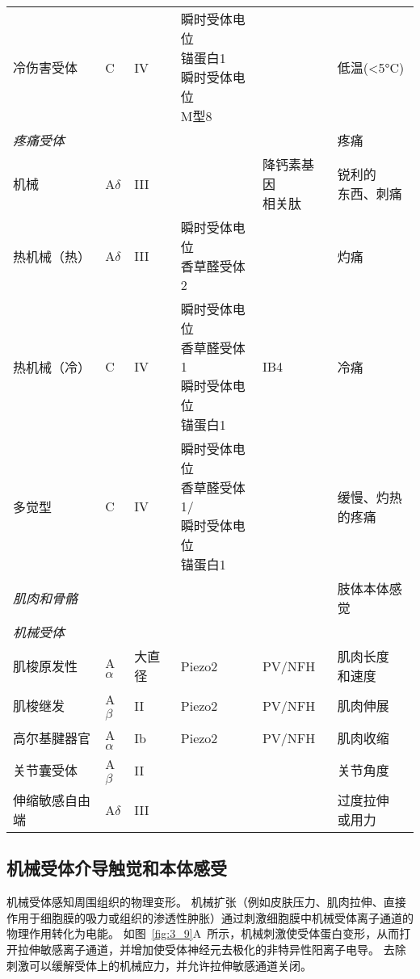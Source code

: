 \begin{table}[htbp]
\begin{tabular}{llllll}
		冷伤害受体 & C & IV & \makecell[l]{瞬时受体电位\\锚蛋白1\\瞬时受体电位\\M型8} &  & 低温(<5°C) \\
		\textit{疼痛受体} &  &  & &  & 疼痛 \\
		机械 & A$\delta$ & III & & \makecell{降钙素基因\\相关肽} & \makecell[l]{锐利的\\东西、刺痛} \\
		热机械（热） & A$\delta$ & III & \makecell[l]{瞬时受体电位\\香草醛受体2} &  & 灼痛 \\
		热机械（冷） & C & IV & \makecell[l]{瞬时受体电位\\香草醛受体1\\瞬时受体电位\\锚蛋白1} & IB4 & 冷痛 \\
		多觉型 & C & IV & \makecell[l]{瞬时受体电位\\香草醛受体1/\\瞬时受体电位\\锚蛋白1} &  & \makecell[l]{缓慢、灼热\\的疼痛} \\
		\textit{肌肉和骨骼} &  &  &  &  & 肢体本体感觉 \\
		\textit{机械受体} &  &  &  &  &  \\
		肌梭原发性 & A$\alpha$ & 大直径 & Piezo2 & PV/NFH & \makecell[l]{肌肉长度\\和速度} \\
		肌梭继发 & A$\beta$ & II & Piezo2 & PV/NFH & 肌肉伸展 \\
		高尔基腱器官 & A$\alpha$ & Ib & Piezo2 & PV/NFH & 肌肉收缩 \\
		关节囊受体 & A$\beta$ & II &  &  & 关节角度 \\
		伸缩敏感自由端 & A$\delta$ & III &  &  & \makecell[l]{过度拉伸\\或用力} \\
		\bottomrule
	\end{tabular}
\end{table}


\subsection{机械受体介导触觉和本体感受}

机械受体感知周围组织的物理变形。
机械扩张（例如皮肤压力、肌肉拉伸、直接作用于细胞膜的吸力或组织的渗透性肿胀）通过刺激细胞膜中机械受体离子通道的物理作用转化为电能。
如图~\ref{fig:3_9}A~所示，机械刺激使受体蛋白变形，从而打开拉伸敏感离子通道，并增加使受体神经元去极化的非特异性阳离子电导。
去除刺激可以缓解受体上的机械应力，并允许拉伸敏感通道关闭。


